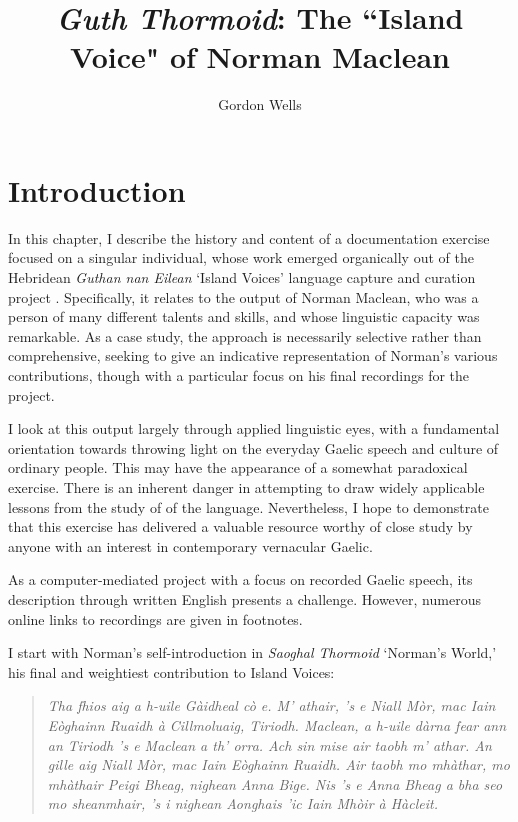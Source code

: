 \documentclass[output=paper,colorlinks,citecolor=brown]{langscibook}
\title{\textit{Guth Thormoid}: The ``Island Voice" of Norman Maclean}
\author{Gordon Wells\affiliation{University of the Highlands and Islands}}
\begin{document}
\maketitle

\section{Introduction}

In this chapter, I describe the history and content of a documentation exercise focused on a singular individual, whose work emerged organically out of the Hebridean \textit{Guthan nan Eilean} `Island Voices' language capture and curation project \citep{gw:Wells2023}. Specifically, it relates to the output of Norman Maclean, who was a person of many different talents and skills, and whose linguistic capacity was remarkable. As a case study, the approach is necessarily selective rather than comprehensive, seeking to give an indicative representation of Norman’s various contributions, though with a particular focus on his final recordings for the project.

I look at this output largely through applied linguistic eyes, with a fundamental orientation towards throwing light on the everyday Gaelic speech and culture of ordinary people. This may have the appearance of a somewhat paradoxical exercise. There is an inherent danger in attempting to draw widely applicable lessons from the study of  of the language. Nevertheless, I hope to demonstrate that this exercise has delivered a valuable resource worthy of close study by anyone with an interest in contemporary vernacular Gaelic.

As a computer-mediated project with a focus on recorded Gaelic speech, its description through written English presents a challenge. However, numerous online links to recordings are given in footnotes.

I start with Norman’s self-introduction in \textit{Saoghal Thormoid} `Norman’s World,' his final and weightiest contribution to Island Voices:

\begin{quote}
\textit{Tha fhios aig a h-uile Gàidheal cò e. M’ athair, ’s e Niall Mòr, mac Iain Eògh\-ainn Ruaidh à Cillmoluaig, Tiriodh. Maclean, a h-uile dàrna fear ann an Tir\-iodh ’s e Maclean a th’ orra. Ach sin mise air taobh m’ athar. An gille aig Niall Mòr, mac Iain Eòghainn Ruaidh. Air taobh mo mhàthar, mo mhàthair Peigi Bheag, nighean Anna Bige. Nis ’s e Anna Bheag a bha seo mo sheanmhair, ’s i nighean Aonghais ’ic Iain Mhòir à Hàcleit.} 
\end{quote}
\end{document}
